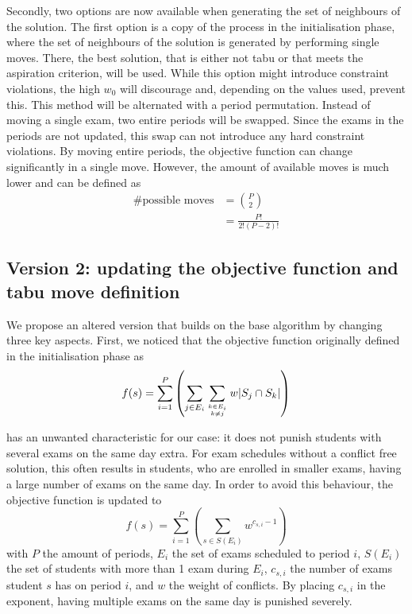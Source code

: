 Secondly, two options are now available when generating the set of neighbours of the solution. The first option is a copy of the process in the initialisation phase, where the set of neighbours of the solution is generated by performing single moves. There, the best solution, that is either not tabu or that meets the aspiration criterion, will be used. While this option might introduce constraint violations, the high $w_0$ will discourage and, depending on the values used, prevent this. This method will be alternated with a period permutation. Instead of moving a single exam, two entire periods will be swapped. Since the exams in the periods are not updated, this swap can not introduce any hard constraint violations. By moving entire periods, the objective function can change significantly in a single move. However, the amount of available moves is much lower and can be defined as
\begin{equation}
\begin{split}
   \text{\# possible moves}  & = \binom{P}{2}   \\
   & = \frac{P!}{2!(P-2)!}
\end{split}
\end{equation}

\subsection{Version 2: updating the objective function and tabu move definition} \label{version2}

We propose an altered version that builds on the base algorithm by changing three key aspects. First, we noticed that the objective function originally defined in the initialisation phase as   
\begin{equation}
    f(s) = \sum_{i=1}^{P} \left( \sum_{j \in E_i}^{}\sum_{k \in E_i \atop k \neq j}^{}w \lvert S_j \cap S_k \rvert \right)
\end{equation}

has an unwanted characteristic for our case: it does not punish students with several exams on the same day extra. For exam schedules without a conflict free solution, this often results in students, who are enrolled in smaller exams, having a large number of exams on the same day. In order to avoid this behaviour, the objective function is updated to
\begin{equation}
    f(s) = \sum_{i=1}^{P} \left( \sum_{s \in S(E_i)}^{}w^{c_{s,i} - 1}\right)
\end{equation}
with $P$ the amount of periods, $E_i$ the set of exams scheduled to period $i$, $S(E_i)$ the set of students with more than 1 exam during $E_i$, $c_{s,i}$ the number of exams student $s$ has on period $i$, and $w$ the weight of conflicts. By placing $c_{s,i}$ in the exponent, having multiple exams on the same day is punished severely. 

